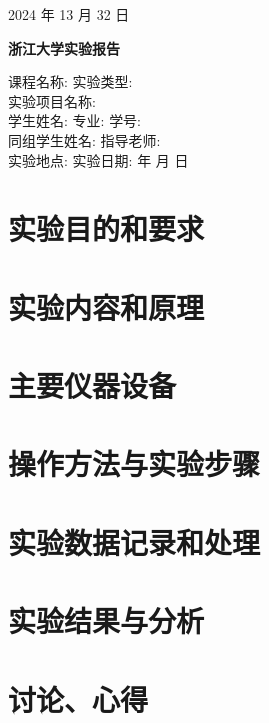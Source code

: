 \documentclass{ctexart}
\begin{document}
\vspace{1.8cm}
\begin{center}
    2024 年 13 月 32 日
\end{center}
\vspace{1cm}


\newpage
\begin{center}
     \bf 浙江大学实验报告
\end{center}
\vspace{1cm}
\noindent 课程名称: \underline{} 
实验类型: \underline{} \\[0.4cm] 
实验项目名称: \underline{} \\[0.4cm] 
学生姓名: \underline{} 
专业: \underline{} 
学号: \underline{} \\[0.4cm]
同组学生姓名: \underline{} 
指导老师: \underline{} \\[0.4cm]
实验地点: \underline{} 
实验日期: \underline{} 年 \underline{} 月 \underline{} 日

\vspace{1.5cm}

\section{实验目的和要求}

\section{实验内容和原理}

\section{主要仪器设备}

\section{操作方法与实验步骤}

\section{实验数据记录和处理}

\section{实验结果与分析}

\section{讨论、心得}

\enddocument
\end{document}
